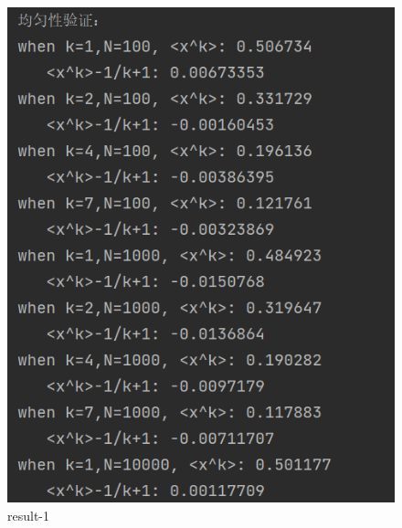 \documentclass{article}
\begin{document}
                \begin{figure}[htbp]
                    \begin{minipage}[t]{0.3\textwidth}%
                        \centering
                        \includegraphics[width=\textwidth]{picture/0.png}
                        \caption{result-1}%
                        \end{minipage}
                    \begin{minipage}[t]{0.3\textwidth}
                        \centering

\end{minipage}
\end{figure}
\end{document}
